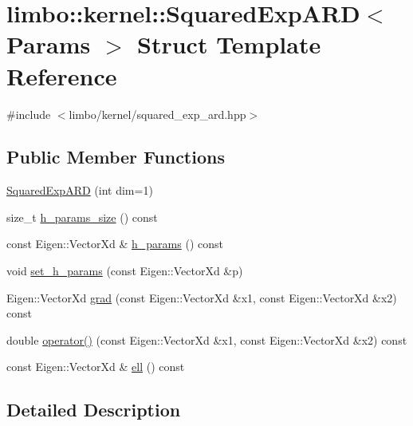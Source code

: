 \hypertarget{structlimbo_1_1kernel_1_1_squared_exp_a_r_d}{}\section{limbo\+:\+:kernel\+:\+:Squared\+Exp\+A\+RD$<$ Params $>$ Struct Template Reference}
\label{structlimbo_1_1kernel_1_1_squared_exp_a_r_d}


{\ttfamily \#include $<$limbo/kernel/squared\+\_\+exp\+\_\+ard.\+hpp$>$}

\subsection*{Public Member Functions}
\begin{DoxyCompactItemize}
\item 
\hyperlink{structlimbo_1_1kernel_1_1_squared_exp_a_r_d_a33d5c074a487792a305a0ae89e864f34}{Squared\+Exp\+A\+RD} (int dim=1)
\item 
size\+\_\+t \hyperlink{structlimbo_1_1kernel_1_1_squared_exp_a_r_d_a42d0d653ef61abce8713acdec5c876a5}{h\+\_\+params\+\_\+size} () const 
\item 
const Eigen\+::\+Vector\+Xd \& \hyperlink{structlimbo_1_1kernel_1_1_squared_exp_a_r_d_a528af96c67834d1ee6bfb8594fcc2956}{h\+\_\+params} () const 
\item 
void \hyperlink{structlimbo_1_1kernel_1_1_squared_exp_a_r_d_a0275e61c4ce395b988c903302d8e088e}{set\+\_\+h\+\_\+params} (const Eigen\+::\+Vector\+Xd \&p)
\item 
Eigen\+::\+Vector\+Xd \hyperlink{structlimbo_1_1kernel_1_1_squared_exp_a_r_d_aa7dd2fbe6e8d5e84101eb3ccce15359e}{grad} (const Eigen\+::\+Vector\+Xd \&x1, const Eigen\+::\+Vector\+Xd \&x2) const 
\item 
double \hyperlink{structlimbo_1_1kernel_1_1_squared_exp_a_r_d_ab3021822831528a6dbb4fcaf0d1c157e}{operator()} (const Eigen\+::\+Vector\+Xd \&x1, const Eigen\+::\+Vector\+Xd \&x2) const 
\item 
const Eigen\+::\+Vector\+Xd \& \hyperlink{structlimbo_1_1kernel_1_1_squared_exp_a_r_d_aad6902b522c4fdd9b5c5799a0c440c40}{ell} () const 
\end{DoxyCompactItemize}


\subsection{Detailed Description}
